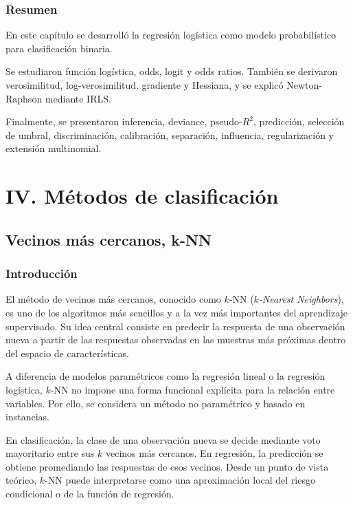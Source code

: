 \documentclass[
  spanish,
  11pt,
  letterpaper,
  DIV=11,
  numbers=noendperiod]{scrreprt}
\theoremstyle{definition}
\theoremstyle{plain}
\theoremstyle{definition}
\theoremstyle{remark}
\begin{document}
\section{Resumen}\label{resumen-10}

En este capítulo se desarrolló la regresión logística como modelo
probabilístico para clasificación binaria.

Se estudiaron función logística, odds, logit y odds ratios. También se
derivaron verosimilitud, log-verosimilitud, gradiente y Hessiana, y se
explicó Newton-Raphson mediante IRLS.

Finalmente, se presentaron inferencia, deviance, pseudo-\(R^2\),
predicción, selección de umbral, discriminación, calibración,
separación, influencia, regularización y extensión multinomial.

\part{IV. Métodos de clasificación}

\chapter{Vecinos más cercanos, k-NN}\label{sec-knn}

\section{Introducción}\label{introducciuxf3n-12}

El método de vecinos más cercanos, conocido como \(k\)-NN
(\emph{\(k\)-Nearest Neighbors}), es uno de los algoritmos más sencillos
y a la vez más importantes del aprendizaje supervisado. Su idea central
consiste en predecir la respuesta de una observación nueva a partir de
las respuestas observadas en las muestras más próximas dentro del
espacio de características.

A diferencia de modelos paramétricos como la regresión lineal o la
regresión logística, \(k\)-NN no impone una forma funcional explícita
para la relación entre variables. Por ello, se considera un método no
paramétrico y basado en instancias.

En clasificación, la clase de una observación nueva se decide mediante
voto mayoritario entre sus \(k\) vecinos más cercanos. En regresión, la
predicción se obtiene promediando las respuestas de esos vecinos. Desde
un punto de vista teórico, \(k\)-NN puede interpretarse como una
aproximación local del riesgo condicional o de la función de regresión.
\end{document}

